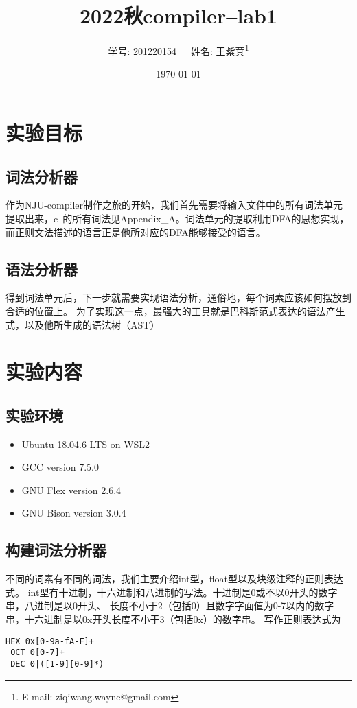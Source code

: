 \documentclass[twocolumn]{article}
\title{2022秋compiler--lab1}
\author{学号: 201220154\ \ \ 姓名: 王紫萁\thanks{E-mail: ziqiwang.wayne@gmail.com}}
\date{\today}
\affil{Department of Computer Science, Nanjing University}
\begin{document}
\maketitle
\section{实验目标}
\subsection{词法分析器}
作为NJU-compiler制作之旅的开始，我们首先需要将输入文件中的所有词法单元
提取出来，c--的所有词法见Appendix\_A\cite{b1}。词法单元的提取利用DFA的思想实现，
而正则文法描述的语言正是他所对应的DFA能够接受的语言。

\subsection{语法分析器}
得到词法单元后，下一步就需要实现语法分析，通俗地，每个词素应该如何摆放到合适的位置上。
为了实现这一点，最强大的工具就是巴科斯范式表达的语法产生式，以及他所生成的语法树（AST）

\section{实验内容}
\subsection{实验环境}
\begin{itemize}
    \item Ubuntu 18.04.6 LTS on WSL2
    \item GCC version 7.5.0
    \item GNU Flex version 2.6.4
    \item GNU Bison version 3.0.4
\end{itemize}
\subsection{构建词法分析器}
不同的词素有不同的词法，我们主要介绍int型，float型以及块级注释的正则表达式。
int型有十进制，十六进制和八进制的写法。十进制是0或不以0开头的数字串，八进制是以0开头、
长度不小于2（包括0）且数字字面值为0-7以内的数字串，十六进制是以0x开头长度不小于3（包括0x）的数字串。
写作正则表达式为
\begin{lstlisting}[style=style1]
 HEX 0x[0-9a-fA-F]+
 OCT 0[0-7]+
 DEC 0|([1-9][0-9]*)
\end{lstlisting}
\end{document}
